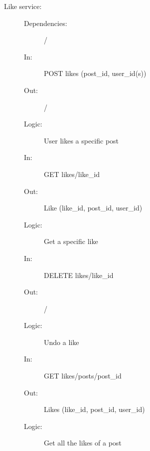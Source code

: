 \documentclass{article}
\begin{document}
\begin{description}
    \item [Like service:]
    \begin{description}
        \item[]
        \item[Dependencies:] /
    \end{description}
    \begin{description}
        \item[]
        \item[In:] POST likes (post\_id, user\_id(s))
        \item[Out:] /
        \item[Logic:] User likes a specific post
        \item[]
        
        \item[In:] GET likes/like\_id
        \item[Out:] Like (like\_id, post\_id, user\_id)
        \item[Logic:] Get a specific like
        \item[]

        \item[In:] DELETE likes/like\_id
        \item[Out:] /
        \item[Logic:] Undo a like
        \item[]

        \item[In:] GET likes/posts/post\_id
        \item[Out:] Likes (like\_id, post\_id, user\_id)
        \item[Logic:] Get all the likes of a post
    \end{description}
\end{description}
\end{document}
